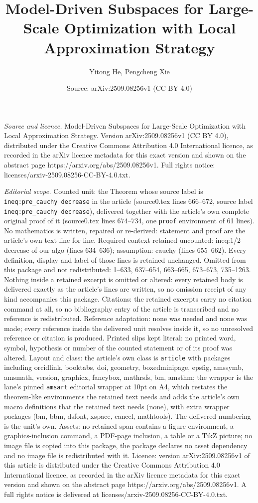 \documentclass[10pt,a4paper]{amsart}
\title[Model-Driven Subspaces for Large-Scale Optimization with Loc]{Model-Driven Subspaces for Large-Scale Optimization with Local Approximation Strategy}
\author{Yitong He, Pengcheng Xie}
\date{Source: arXiv:2509.08256v1 (CC BY 4.0)}
\begin{document}
\maketitle

\noindent\emph{Source and licence.} Model-Driven Subspaces for Large-Scale Optimization with Local Approximation Strategy. Version arXiv:2509.08256v1 (CC BY 4.0), distributed under the Creative Commons Attribution 4.0 International licence, as recorded in the arXiv licence metadata for this exact version and shown on the abstract page https://arxiv.org/abs/2509.08256v1. Full rights notice: licenses/arxiv-2509.08256-CC-BY-4.0.txt.\par\smallskip

\noindent\textit{Editorial scope.} Counted unit: the Theorem whose source label is \texttt{ineq:pre\_cauchy decrease} in the article (source0.tex lines 666--672, source label \texttt{ineq:pre\_cauchy decrease}), delivered together with the article's own complete original proof of it (source0.tex lines 674--734, one \texttt{proof} environment of 61 lines). No mathematics is written, repaired or re-derived: statement and proof are the article's own text line for line. Required context retained uncounted: ineq:1/2 decrease of our algo (lines 634--636); assumption: cauchy (lines 655--662). Every definition, display and label of those lines is retained unchanged. Omitted from this package and not redistributed: 1--633, 637--654, 663--665, 673--673, 735--1263. Nothing inside a retained excerpt is omitted or altered: every retained body is delivered exactly as the article's lines are written, so no omission receipt of any kind accompanies this package. Citations: the retained excerpts carry no citation command at all, so no bibliography entry of the article is transcribed and no reference is redistributed. Reference adaptation: none was needed and none was made; every reference inside the delivered unit resolves inside it, so no unresolved reference or citation is produced. Printed slips kept literal: no printed word, symbol, hypothesis or number of the counted statement or of its proof was altered. Layout and class: the article's own class is \texttt{article} with packages including orcidlink, booktabs, doi, geometry, boxedminipage, epsfig, amssymb, amsmath, version, graphicx, fancybox, mathrsfs, bm, amsthm; the wrapper is the lane's pinned \texttt{amsart} editorial wrapper at 10pt on A4, which restates the theorem-like environments the retained text needs and adds the article's own macro definitions that the retained text needs (none), with extra wrapper packages (bm, bbm, dsfont, xspace, cancel, mathtools). The delivered numbering is the unit's own. Assets: no retained span contains a figure environment, a graphics-inclusion command, a PDF-page inclusion, a table or a TikZ picture; no image file is copied into this package, the package declares no asset dependency and no image file is redistributed with it. Licence: version arXiv:2509.08256v1 of this article is distributed under the Creative Commons Attribution 4.0 International licence, as recorded in the arXiv licence metadata for this exact version and shown on the abstract page https://arxiv.org/abs/2509.08256v1. A full rights notice is delivered at licenses/arxiv-2509.08256-CC-BY-4.0.txt. 
\end{document}
